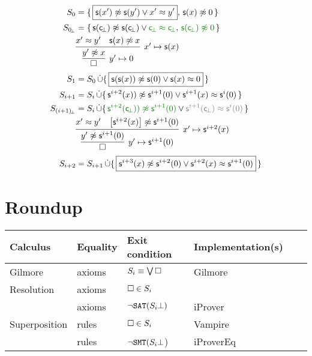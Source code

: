 \begin{align*}
S_0 &= \{\, \boxed{\msucc(x') \mNE \msucc (y') \lor x' \mEQ y'}, \, \msucc(x)\mNE 0 \, \}
\\
S_{0\!_\bot} &= \{\, \msucc(\consbot) \mNE \msucc (\consbot) \lor{\colHi\consbot \mEQ \consbot}, \, {\colHi \msucc(\consbot)\mNE 0} \, \}
\\
&\infer[x'\mapsto \msucc(x)
]{
	\infer[y'\mapsto 0]{\emptyclause}{ y'\mNE x }
}
{x' \mEQ y' & \msucc(x)\mNE x}
\\
S_1 &= S_0\disjointunion \{\,
\boxed{\msucc(\msucc(x)) \mNE \msucc(0) \lor \msucc(x) \mEQ 0} \,
\}
\\
S_{i+1} &= S_i\disjointunion \{\,
\msucc^{i+2}(x)) \mNE \msucc^{i+1} (0) \lor \msucc^{i+1}(x) \mEQ \msucc^i(0) \,
\}
\\
S_{(i+1)\!_\bot} &= S_i\disjointunion \{\,
{\colHi \msucc^{i+2}(\consbot)) \mNE \msucc^{i+1} (0)} \lor {\colG\msucc^{i+1}(\consbot) \mEQ \msucc^i(0)} \,
\}
\\
&\infer[x'\mapsto \msucc^{i+2}(x)
]{
	\infer[y'\mapsto \msucc^{i+1}(0)]{\emptyclause}{ y'\mNE \msucc^{i+1}(0) }
}
{x' \mEQ y' & \left[\msucc^{i+2}(x)\right]\mNE \msucc^{i+1}(0)}
\\
S_{i+2} &= S_{i+1}\disjointunion \{\,
\boxed{\msucc^{i+3}(x) \mNE \msucc^{i+2}(0) \lor \msucc^{i+2}(x) \mEQ \msucc^{i+1}(0)} \,
\}
\end{align*}

\section{Roundup}

\begin{tabular}{llllll}
	Calculus & Equality & Exit condition & Implementation(s)\\
	\hline
	Gilmore & axioms & $S_i \equiv \bigvee\square$  & Gilmore\\
	Resolution & axioms & $\square\in S_i$\\
	\InstGen & axioms & $\lnot\texttt{SAT}(S_i\bot)$ & iProver\\
	Superposition & rules & $\square\in S_i$ & Vampire \\
	\InstGenEQ & rules & $\lnot\texttt{SMT}(S_i\bot$) & iProverEq
\end{tabular}





